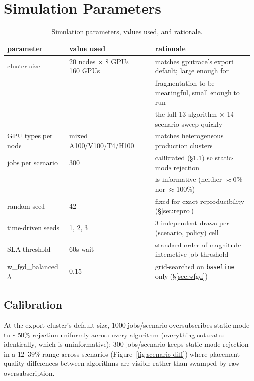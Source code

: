 \documentclass[11pt]{article}
\begin{document}
\section{Simulation Parameters}
\begin{table}[h]
\centering
\caption{Simulation parameters, values used, and rationale.}
\small
\begin{tabular}{lll}
\toprule
parameter & value used & rationale \\
\midrule
cluster size & 20 nodes $\times$ 8 GPUs = 160 GPUs & matches gputrace's export default; large enough for \\
 & & fragmentation to be meaningful, small enough to run \\
 & & the full 13-algorithm $\times$ 14-scenario sweep quickly \\
GPU types per node & mixed A100/V100/T4/H100 & matches heterogeneous production clusters \citep{alibabatrace2023} \\
jobs per scenario & 300 & calibrated (\S\ref{sec:calibration}) so static-mode rejection \\
 & & is informative (neither $\approx$0\% nor $\approx$100\%) \\
random seed & 42 & fixed for exact reproducibility (\S\ref{sec:repro}) \\
time-driven seeds & 1, 2, 3 & 3 independent draws per (scenario, policy) cell \\
SLA threshold & 60s wait & standard order-of-magnitude interactive-job threshold \\
w\_fgd\_balanced $\lambda$ & 0.15 & grid-searched on \texttt{baseline} only (\S\ref{sec:wfgd}) \\
\bottomrule
\end{tabular}
\end{table}

\subsection{Calibration}
\label{sec:calibration}
At the export cluster's default size, 1000 jobs/scenario oversubscribes
static mode to $\sim$50\% rejection uniformly across every algorithm
(everything saturates identically, which is uninformative); 300
jobs/scenario keeps static-mode rejection in a $12$--$39\%$ range across
scenarios (Figure~\ref{fig:scenario-diff}) where placement-quality
differences between algorithms are visible rather than swamped by raw
oversubscription.
\end{document}
